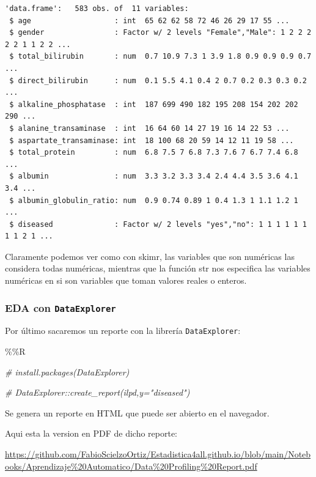 \documentclass[
  11pt,
  a4paper,
]{article}
\newenvironment{Shaded}{\begin{snugshade}}{\end{snugshade}}
\newcommand{\CommentTok}[1]{\textcolor[rgb]{0.56,0.35,0.01}{\textit{#1}}}
\newcommand{\NormalTok}[1]{#1}
\newcommand{\SpecialCharTok}[1]{\textcolor[rgb]{0.00,0.00,0.00}{#1}}
\begin{document}
\begin{verbatim}
'data.frame':   583 obs. of  11 variables:
 $ age                   : int  65 62 62 58 72 46 26 29 17 55 ...
 $ gender                : Factor w/ 2 levels "Female","Male": 1 2 2 2 2 2 1 1 2 2 ...
 $ total_bilirubin       : num  0.7 10.9 7.3 1 3.9 1.8 0.9 0.9 0.9 0.7 ...
 $ direct_bilirubin      : num  0.1 5.5 4.1 0.4 2 0.7 0.2 0.3 0.3 0.2 ...
 $ alkaline_phosphatase  : int  187 699 490 182 195 208 154 202 202 290 ...
 $ alanine_transaminase  : int  16 64 60 14 27 19 16 14 22 53 ...
 $ aspartate_transaminase: int  18 100 68 20 59 14 12 11 19 58 ...
 $ total_protein         : num  6.8 7.5 7 6.8 7.3 7.6 7 6.7 7.4 6.8 ...
 $ albumin               : num  3.3 3.2 3.3 3.4 2.4 4.4 3.5 3.6 4.1 3.4 ...
 $ albumin_globulin_ratio: num  0.9 0.74 0.89 1 0.4 1.3 1 1.1 1.2 1 ...
 $ diseased              : Factor w/ 2 levels "yes","no": 1 1 1 1 1 1 1 1 2 1 ...
\end{verbatim}

Claramente podemos ver como con skimr, las variables que son numéricas
las considera todas numéricas, mientras que la función str nos
especifica las variables numéricas en si son variables que toman valores
reales o enteros.

\hypertarget{eda-con-dataexplorer}{%
\subsubsection{\texorpdfstring{EDA con \texttt{DataExplorer}
}{EDA con DataExplorer }}\label{eda-con-dataexplorer}}

Por último sacaremos un reporte con la librería \texttt{DataExplorer}:

\begin{Shaded}
\begin{Highlighting}[]
\SpecialCharTok{\%\%}\NormalTok{R}

\CommentTok{\# install.packages(\textquotesingle{}DataExplorer\textquotesingle{})}

\CommentTok{\# DataExplorer::create\_report(ilpd,y="diseased") }
\end{Highlighting}
\end{Shaded}

Se genera un reporte en HTML que puede ser abierto en el navegador.

Aqui esta la version en PDF de dicho reporte:

\url{https://github.com/FabioScielzoOrtiz/Estadistica4all.github.io/blob/main/Notebooks/Aprendizaje\%20Automatico/Data\%20Profiling\%20Report.pdf}
\end{document}
